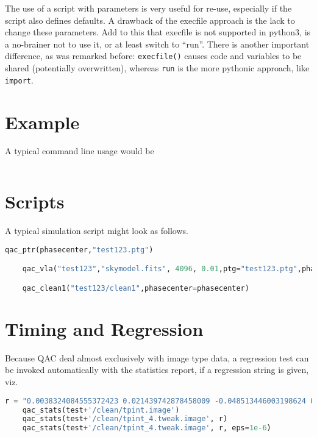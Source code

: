 \documentclass[12pt,a4paper]{article}
\begin{document}
The use of a script with parameters is very useful for re-use, especially if the script also defines defaults. A 
drawback of the execfile approach is the lack to change these parameters. Add to this that execfile is not supported
in python3, is a no-brainer not to use it, or at least switch to ``run''. There is another important difference,
as was remarked before:  {\tt execfile()} causes code and variables to be shared (potentially overwritten), whereas
{\tt run} is the more pythonic approach, like {\tt import}.


\section{Example}

A typical command line usage would be

\begin{lstlisting}[language=bash]
    % casa --nogui -c myscript.py scale=2.0 nants=46 niter='[0,1000,10000]'
\end{lstlisting}


\section{Scripts}

A typical simulation script might look as follows.

\begin{lstlisting}[language=python]
    qac_ptr(phasecenter,"test123.ptg")

    qac_vla("test123","skymodel.fits", 4096, 0.01,ptg="test123.ptg",phasecenter=phasecenter)

    qac_clean1("test123/clean1",phasecenter=phasecenter)
\end{lstlisting}

\section{Timing and Regression}

Because QAC deal almost exclusively with image type data, a regression test can be invoked automatically
with the statistics report, if a regression string is given, viz.


\begin{lstlisting}[language=python]
    r = "0.0038324084555372423 0.021439742878458009 -0.048513446003198624 0.41929447650909424 383.60327838373536"
    qac_stats(test+'/clean/tpint.image')
    qac_stats(test+'/clean/tpint_4.tweak.image', r)
    qac_stats(test+'/clean/tpint_4.tweak.image', r, eps=1e-6)    
\end{lstlisting}
\end{document}
